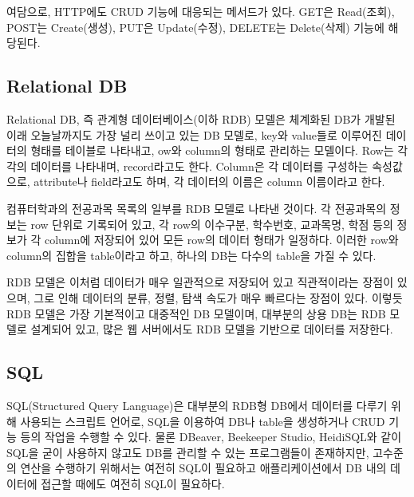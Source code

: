 여담으로, HTTP에도 CRUD 기능에 대응되는 메서드가 있다. GET은 Read(조회), POST는 Create(생성), PUT은 Update(수정), DELETE는 Delete(삭제) 기능에 해당된다.
\newpage

\subsection*{Relational DB}

Relational DB, 즉 관계형 데이터베이스(이하 RDB) 모델은 체계화된 DB가 개발된 이래 오늘날까지도 가장 널리 쓰이고 있는 DB 모델로, key와 value들로 이루어진 데이터의 형태를 테이블로 나타내고, ow와 column의 형태로 관리하는 모델이다. Row는 각각의 데이터를 나타내며, record라고도 한다. Column은 각 데이터를 구성하는 속성값으로, attribute나 field라고도 하며, 각 데이터의 이름은 column 이름이라고 한다.


\은 컴퓨터학과의 전공과목 목록의 일부를 RDB 모델로 나타낸 것이다. 각 전공과목의 정보는 row 단위로 기록되어 있고, 각 row의 이수구분, 학수번호, 교과목명, 학점 등의 정보가 각 column에 저장되어 있어 모든 row의 데이터 형태가 일정하다. 이러한 row와 column의 집합을 table이라고 하고, 하나의 DB는 다수의 table을 가질 수 있다.

RDB 모델은 이처럼 데이터가 매우 일관적으로 저장되어 있고 직관적이라는 장점이 있으며, 그로 인해 데이터의 분류, 정렬, 탐색 속도가 매우 빠르다는 장점이 있다. 이렇듯 RDB 모델은 가장 기본적이고 대중적인 DB 모델이며, 대부분의 상용 DB는 RDB 모델로 설계되어 있고, 많은 웹 서버에서도 RDB 모델을 기반으로 데이터를 저장한다.

\subsection*{SQL}

SQL(Structured Query Language)은 대부분의 RDB형 DB에서 데이터를 다루기 위해 사용되는 스크립트 언어로, SQL을 이용하여 DB나 table을 생성하거나 CRUD 기능 등의 작업을 수행할 수 있다. 물론 DBeaver, Beekeeper Studio, HeidiSQL와 같이 SQL을 굳이 사용하지 않고도 DB를 관리할 수 있는 프로그램들이 존재하지만, 고수준의 연산을 수행하기 위해서는 여전히 SQL이 필요하고 애플리케이션에서 DB 내의 데이터에 접근할 때에도 여전히 SQL이 필요하다.
